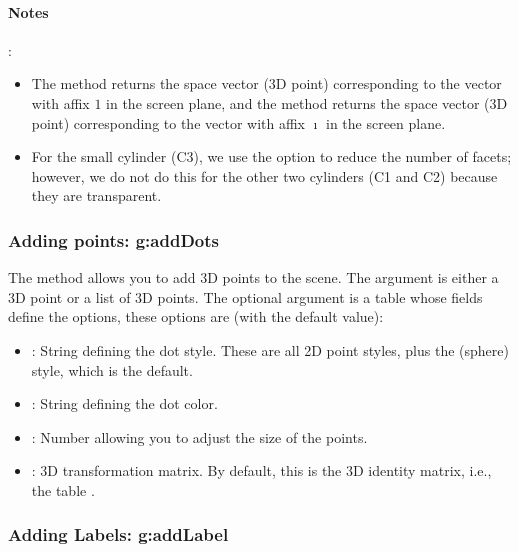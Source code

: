 \paragraph{Notes}:
\begin{itemize}
    \item The  method returns the space vector (3D point) corresponding to the vector with affix $1$ in the screen plane, and the  method returns the space vector (3D point) corresponding to the vector with affix $\imath$ in the screen plane.
    \item For the small cylinder (C3), we use the  option to reduce the number of facets; however, we do not do this for the other two cylinders (C1 and C2) because they are transparent.
\end{itemize}

\subsubsection{Adding points: g:addDots}

The  method allows you to add 3D points to the scene. The argument  is either a 3D point or a list of 3D points. The optional argument  is a table whose fields define the options, these options are (with the default value):
\begin{itemize}
    \item {}: String defining the dot style. These are all 2D point styles, plus the  (sphere) style, which is the default.
    \item {}: String defining the dot color.
    \item {}: Number allowing you to adjust the size of the points.
    \item {}: 3D transformation matrix. By default, this is the 3D identity matrix, i.e., the table .
\end{itemize}

\subsubsection{Adding Labels: g:addLabel}

